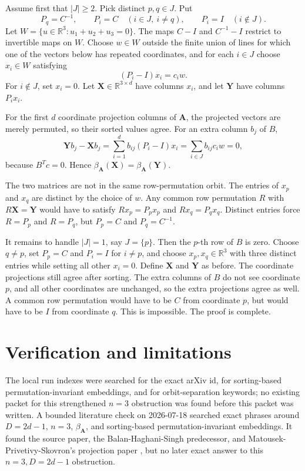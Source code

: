 \documentclass[11pt]{article}
\newcommand{\R}{\mathbb{R}}
\begin{document}
Assume first that \(|J|\ge2\).  Pick distinct \(p,q\in J\).  Put
\[
  P_q=C^{-1},\qquad P_i=C\quad(i\in J,\ i\ne q),\qquad P_i=I\quad(i\notin J).
\]
Let \(W=\{u\in\R^3:u_1+u_2+u_3=0\}\).  The maps \(C-I\) and \(C^{-1}-I\)
restrict to invertible maps on \(W\).  Choose \(w\in W\) outside the finite
union of lines for which one of the vectors below has repeated coordinates,
and for each \(i\in J\) choose \(x_i\in W\) satisfying
\[
  (P_i-I)x_i=c_iw.
\]
For \(i\notin J\), set \(x_i=0\).  Let \(\mathbf X\in\R^{3\times d}\) have
columns \(x_i\), and let \(\mathbf Y\) have columns \(P_ix_i\).

For the first \(d\) coordinate projection columns of \(\mathbf A\), the
projected vectors are merely permuted, so their sorted values agree.  For an
extra column \(b_j\) of \(B\),
\[
  \mathbf Y b_j-\mathbf X b_j
  =\sum_{i=1}^d b_{ij}(P_i-I)x_i
  =\sum_{i\in J} b_{ij}c_iw
  =0,
\]
because \(B^Tc=0\).  Hence \(\beta_{\mathbf A}(\mathbf X)=
\beta_{\mathbf A}(\mathbf Y)\).

The two matrices are not in the same row-permutation orbit.  The entries of
\(x_p\) and \(x_q\) are distinct by the choice of \(w\).  Any common row
permutation \(R\) with \(R\mathbf X=\mathbf Y\) would have to satisfy
\(Rx_p=P_px_p\) and \(Rx_q=P_qx_q\).  Distinct entries force
\(R=P_p\) and \(R=P_q\), but \(P_p=C\) and \(P_q=C^{-1}\).

It remains to handle \(|J|=1\), say \(J=\{p\}\).  Then the \(p\)-th row of
\(B\) is zero.  Choose \(q\ne p\), set \(P_p=C\) and \(P_i=I\) for
\(i\ne p\), and choose \(x_p,x_q\in\R^3\) with three distinct entries while
setting all other \(x_i=0\).  Define \(\mathbf X\) and \(\mathbf Y\) as
before.  The coordinate projections still agree after sorting.  The extra
columns of \(B\) do not see coordinate \(p\), and all other coordinates are
unchanged, so the extra projections agree as well.  A common row permutation
would have to be \(C\) from coordinate \(p\), but would have to be \(I\) from
coordinate \(q\).  This is impossible.  The proof is complete.

\section*{Verification and limitations}

The local run indexes were searched for the exact arXiv id, for
sorting-based permutation-invariant embeddings, and for orbit-separation
keywords; no existing packet for this strengthened \(n=3\) obstruction was
found before this packet was written.  A bounded literature check on
2026-07-18 searched exact phrases around \(D=2d-1\), \(n=3\),
\(\beta_{\mathbf A}\), and sorting-based permutation-invariant embeddings.
It found the source paper, the Balan-Haghani-Singh predecessor, and
Matousek-Pri\-vetivy-Skovron's projection paper \cite{MatousekEtAl}, but no
later exact answer to this \(n=3,D=2d-1\) obstruction.
\end{document}

